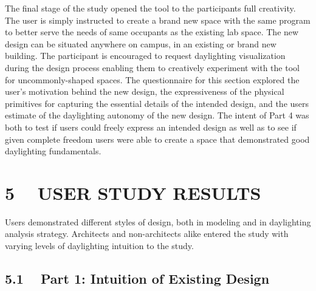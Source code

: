 \documentclass{article}
\begin{document}
The final stage of the study opened the tool to the participants full
creativity.  The user is simply instructed to create a brand new space
with the same program to better serve the needs of same occupants as
the existing lab space.  The new design can be situated anywhere on
campus, in an existing or brand new building.  The participant is
encouraged to request daylighting visualization during the design
process enabling them to creatively experiment with the tool for
uncommonly-shaped spaces.
%
The questionnaire for this section explored the user's motivation
behind the new design, the expressiveness of the physical primitives
for capturing the essential details of the intended design, and the
users estimate of the daylighting autonomy of the new design.  The
intent of Part 4 was both to test if users could freely express an
intended design as well as to see if given complete freedom users were
able to create a space that demonstrated good daylighting
fundamentals.



\section{5 ~ USER STUDY RESULTS}

Users demonstrated different styles of design, both in modeling and in
daylighting analysis strategy.  Architects and non-architects alike
entered the study with varying levels of daylighting intuition to the
study.

\subsection{5.1 ~ Part 1: Intuition of Existing Design}
\end{document}
